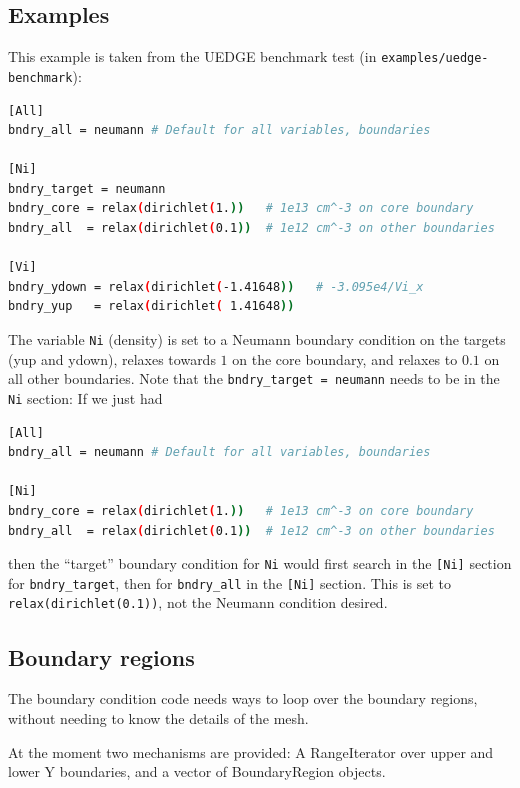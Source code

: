 \documentclass[12pt]{article}
\newcommand{\code}[1]{\texttt{#1}}
\begin{document}
\subsection{Examples}
%
This example is taken from the UEDGE benchmark test (in
\texttt{examples/uedge-benchmark}):
%
\begin{lstlisting}[language=bash,numbers=none]
[All]
bndry_all = neumann # Default for all variables, boundaries

[Ni]
bndry_target = neumann
bndry_core = relax(dirichlet(1.))   # 1e13 cm^-3 on core boundary
bndry_all  = relax(dirichlet(0.1))  # 1e12 cm^-3 on other boundaries

[Vi]
bndry_ydown = relax(dirichlet(-1.41648))   # -3.095e4/Vi_x
bndry_yup   = relax(dirichlet( 1.41648))
\end{lstlisting}
%
The variable \code{Ni} (density) is set to a Neumann boundary condition on the
targets (yup and ydown), relaxes towards $1$ on the core boundary, and relaxes
to $0.1$ on all other boundaries. Note that the \code{bndry\_target = neumann}
needs to be in the \code{Ni} section: If we just had
%
\begin{lstlisting}[language=bash,numbers=none]
[All]
bndry_all = neumann # Default for all variables, boundaries

[Ni]
bndry_core = relax(dirichlet(1.))   # 1e13 cm^-3 on core boundary
bndry_all  = relax(dirichlet(0.1))  # 1e12 cm^-3 on other boundaries
\end{lstlisting}
%
then the ``target'' boundary condition for \code{Ni} would first search in the
\code{[Ni]} section for \code{bndry\_target}, then for \code{bndry\_all} in the
\code{[Ni]} section. This is set to \code{relax(dirichlet(0.1))}, not the
Neumann condition desired.



\subsection{Boundary regions}
%
The boundary condition code
needs ways to loop over the boundary regions, without needing to know the
details of the mesh.

At the moment two mechanisms are provided: A RangeIterator over upper and lower
Y boundaries, and a vector of BoundaryRegion
%
%
 objects.
\end{document}
